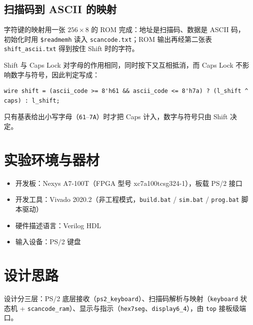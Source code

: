 \documentclass[12pt, a4paper]{ctexart}
\begin{document}
\subsection{扫描码到 ASCII 的映射}
字符键的映射用一张 $256\times8$ 的 ROM 完成：地址是扫描码、数据是 ASCII 码，初始化时用 \texttt{\$readmemh} 读入 \texttt{scancode.txt}；ROM 输出再经第二张表 \texttt{shift\_ascii.txt} 得到按住 Shift 时的字符。

Shift 与 Caps Lock 对字母的作用相同，同时按下又互相抵消，而 Caps Lock 不影响数字与符号，因此判定写成：

\begin{lstlisting}
wire shift = (ascii_code >= 8'h61 && ascii_code <= 8'h7a) ? (l_shift ^ caps) : l_shift;
\end{lstlisting}

\noindent 只有基表给出小写字母（\texttt{61}--\texttt{7A}）时才把 Caps 计入，数字与符号只由 Shift 决定。

\section{实验环境与器材}
\begin{itemize}
    \item 开发板：Nexys A7-100T（FPGA 型号 xc7a100tcsg324-1），板载 PS/2 接口
    \item 开发工具：Vivado 2020.2（非工程模式，\texttt{build.bat} / \texttt{sim.bat} / \texttt{prog.bat} 脚本驱动）
    \item 硬件描述语言：Verilog HDL
    \item 输入设备：PS/2 键盘
\end{itemize}

\section{设计思路}

设计分三层：PS/2 底层接收（\texttt{ps2\_keyboard}）、扫描码解析与映射（\texttt{keyboard} 状态机 + \texttt{scancode\_ram}）、显示与指示（\texttt{hex7seg}、\texttt{display6\_4}），由 \texttt{top} 接板级端口。
\end{document}
